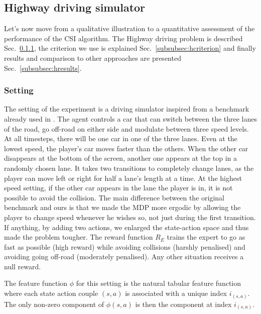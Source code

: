 \documentclass[smallextended]{svjour3}
\begin{document}
\subsection{Highway driving simulator}
\label{subsec:highway}
Let's now move from a qualitative illustration to a quantitative assessment of the performance of the CSI algorithm. The Highway driving problem is described Sec.~\ref{subsubsec:hsetting}, the criterion we use is explained Sec.~\ref{subsubsec:hcriterion} and finally results and comparison to other approaches are presented Sec.~\ref{subsubsec:hresults}.
\subsubsection{Setting}
\label{subsubsec:hsetting}
The setting of the experiment is a driving simulator inspired from a benchmark already used in \cite{syed2008apprenticeship,syed2008game}. The agent controls a car that can switch between the three lanes of the road, go off-road on either side and modulate between three speed levels. At all timesteps, there will be one car in one of the three lanes. Even at the lowest speed, the player's car moves faster than the others. When the other car disappears at the bottom of the screen, another one appears at the top in a randomly chosen lane. It takes two transitions to completely change lanes, as the player can move left or right for half a lane's length at a time. At the highest speed setting, if the other car appears in the lane the player is in, it is not possible to avoid the collision. The main difference between the original benchmark \cite{syed2008apprenticeship,syed2008game} and ours is that we made the MDP more ergodic by allowing the player to change speed whenever he wishes so, not just during the first transition. If anything, by adding two actions, we enlarged the state-action space and thus made the problem tougher.
The reward function $R_E$ trains the expert to go as fast as possible (high reward) while avoiding collisions (harshly penalised) and avoiding going off-road (moderately penalised). Any other situation receives a null reward.

The feature function $\phi$ for this setting is the natural tabular feature function where each state action couple $(s,a)$ is associated with a unique index $i_{(s,a)}$. The only non-zero component of $\phi(s,a)$ is then the component at index $i_{(s,a)}$.
\end{document}
